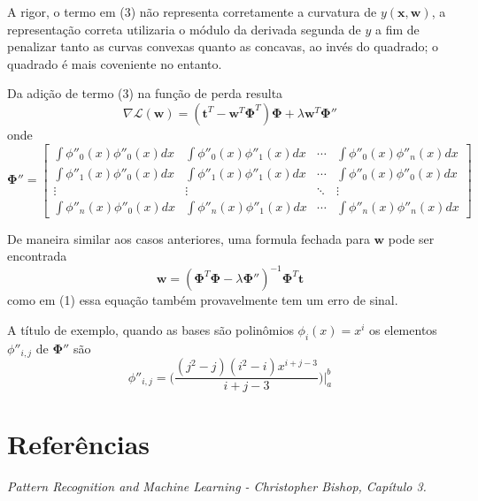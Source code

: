 \documentclass{article}
\begin{document}
A rigor, o termo em (3) não representa corretamente a curvatura de \( y(\textbf{x}, \textbf{w}) \), a representação 
correta utilizaria o módulo da derivada segunda de \( y \) a fim de penalizar tanto as curvas convexas quanto as concavas, ao
invés do quadrado; o quadrado é mais coveniente no entanto.

Da adição de termo (3) na função de perda resulta
\begin{equation}
    \nabla \mathcal{L}(\textbf{w}) = (\textbf{t}^T - \textbf{w}^T \boldsymbol{\Phi}^T) \boldsymbol{\Phi} + \lambda \textbf{w}^T \boldsymbol{\Phi}'' 
\end{equation}
onde 
\[
    \boldsymbol{\Phi}'' = 
    \begin{bmatrix}
        \int \phi''_0(x) \phi''_0(x) dx  &  \int \phi''_0(x) \phi''_1(x) dx  &  \dotsb  & \int \phi''_0(x) \phi''_n(x) dx \\
        \int \phi''_1(x) \phi''_0(x) dx  &  \int \phi''_1(x) \phi''_1(x) dx  &  \dotsb  & \int \phi''_0(x) \phi''_0(x) dx \\
        \vdots & \vdots & \ddots & \vdots \\
        \int \phi''_n(x) \phi''_0(x) dx & \int \phi''_n(x) \phi''_1(x) dx & \dotsb & \int \phi''_n(x) \phi''_n(x) dx
    \end{bmatrix}
\]

De maneira similar aos casos anteriores, uma formula fechada para \( \textbf{w} \) pode ser encontrada
\[
    \textbf{w} = (\boldsymbol{\Phi}^T \boldsymbol{\Phi} - \lambda \boldsymbol{\Phi}'' )^{-1} \boldsymbol{\Phi}^T \textbf{t}
\]
como em (1) essa equação também provavelmente tem um erro de sinal.

A título de exemplo, quando as bases são polinômios \( \phi_i(x) = x^i \) os elementos \( \phi''_{i, j} \) de \( \boldsymbol{\Phi}'' \)
são
\[
    \phi''_{i, j} = \Bigg(\frac{(j^2 - j)(i^2 - i)x^{i+j-3}}{i+j-3} \Bigg) \biggr\rvert_{a}^{b}
\]

\section{Referências}

\emph{Pattern Recognition and Machine Learning - Christopher Bishop, Capítulo 3.}
\end{document}
